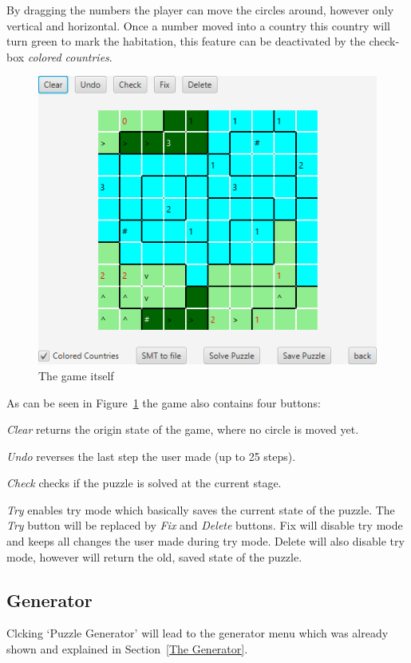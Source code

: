 By dragging the numbers the player can move the circles around, however only vertical and horizontal. Once a number moved into a country this country will turn green to mark the habitation, this feature can be deactivated by the check-box \emph{colored countries}.
\begin{figure}
  \centering
  \includegraphics[scale=1]{Pictures/game.png} 
  \caption{The game itself}
  \label{fig:game}
\end{figure}
As can be seen in Figure~\ref{fig:game} the game also contains four buttons:

\emph{Clear} returns the origin state of the game, where no circle is moved yet.

\emph{Undo} reverses the last step the user made (up to 25 steps).

\emph{Check} checks if the puzzle is solved at the current stage.

\emph{Try} enables try mode which basically saves the current state of the puzzle. The \emph{Try} button will be replaced by \emph{Fix} and \emph{Delete} buttons. Fix will disable try mode and keeps all changes the user made during try mode. Delete will also disable try mode, however will return the old, saved state of the puzzle.

\subsection{Generator} Clcking `Puzzle Generator' will lead to the generator menu which was already shown and explained in Section~\ref{The Generator}.

